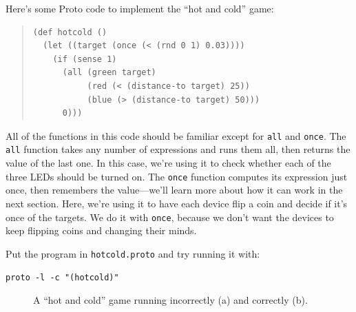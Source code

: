 \documentclass{article}
\newcommand\code[1]{\begin{center}\var{#1}\end{center}}
\newcommand\var[1]{{\tt #1}}
\begin{document}
Here's some Proto code to implement the ``hot and cold'' game:

\begin{quote}
\begin{verbatim}
(def hotcold ()
  (let ((target (once (< (rnd 0 1) 0.03))))
    (if (sense 1)
      (all (green target)
           (red (< (distance-to target) 25))
           (blue (> (distance-to target) 50)))
      0)))
\end{verbatim}
\end{quote}

All of the functions in this code should be familiar except for
\var{all} and \var{once}.  The \var{all} function takes any number of
expressions and runs them all, then returns the value of the last one.
In this case, we're using it to check whether each of the three LEDs
should be turned on.  The \var{once} function computes its expression
just once, then remembers the value---we'll learn more about how it
can work in the next section.  Here, we're using it to have each
device flip a coin and decide if it's once of the targets.  We do it
with \var{once}, because we don't want the devices to keep flipping
coins and changing their minds.

Put the program in \var{hotcold.proto} and try running it with:

\code{proto -l -c "(hotcold)"}

\begin{figure}[ht]
\centering
{}
\caption{A ``hot and cold'' game running incorrectly (a) and correctly (b).}
\label{f:ifvmux}
\end{figure}
\end{document}
